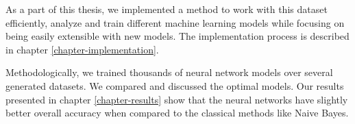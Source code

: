 As a part of this thesis, we implemented a method to work with this dataset efficiently, analyze and train different machine learning models while focusing on being easily extensible with new models. The implementation process is described in chapter \ref{chapter-implementation}.

Methodologically, we trained thousands of neural network models over several generated datasets. We compared and discussed the optimal models. Our results presented in chapter \ref{chapter-results} show that the neural networks have slightly better overall accuracy when compared to the classical methods like Naive Bayes.


